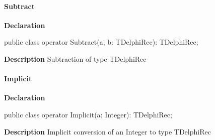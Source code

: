 \documentclass{report}
\newif\ifpdf
\begin{document}
\paragraph*{Subtract}\hspace*{\fill}

\label{ok_operator_test.TDelphiRec-Subtract}
\begin{list}{}{
\setlength{\itemindent}{0cm}
\setlength{\listparindent}{0cm}
\setlength{\leftmargin}{\evensidemargin}
\addtolength{\leftmargin}{\tmplength}
\settowidth{\labelsep}{X}
\addtolength{\leftmargin}{\labelsep}
\setlength{\labelwidth}{\tmplength}
}
\item[\textbf{Declaration}\hfill]
\ifpdf
\begin{flushleft}
\fi
\begin{ttfamily}
public class operator Subtract(a, b: TDelphiRec): TDelphiRec;\end{ttfamily}

\ifpdf
\end{flushleft}
\fi

\par
\item[\textbf{Description}]
Subtraction of type TDelphiRec

\end{list}
\paragraph*{Implicit}\hspace*{\fill}

\label{ok_operator_test.TDelphiRec-Implicit}
\begin{list}{}{
\setlength{\itemindent}{0cm}
\setlength{\listparindent}{0cm}
\setlength{\leftmargin}{\evensidemargin}
\addtolength{\leftmargin}{\tmplength}
\settowidth{\labelsep}{X}
\addtolength{\leftmargin}{\labelsep}
\setlength{\labelwidth}{\tmplength}
}
\item[\textbf{Declaration}\hfill]
\ifpdf
\begin{flushleft}
\fi
\begin{ttfamily}
public class operator Implicit(a: Integer): TDelphiRec;\end{ttfamily}

\ifpdf
\end{flushleft}
\fi

\par
\item[\textbf{Description}]
Implicit conversion of an Integer to type TDelphiRec

\end{list}
\end{document}
